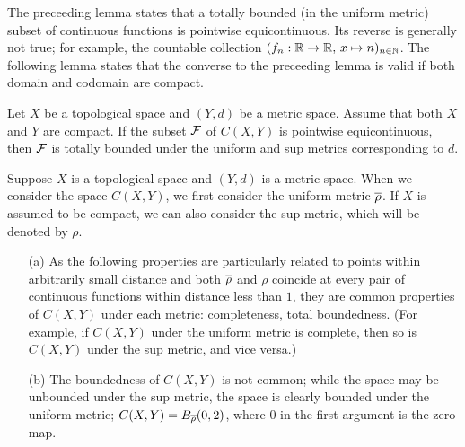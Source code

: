 The preceeding lemma states that a totally bounded (in the uniform metric) subset of continuous functions is pointwise equicontinuous.
Its reverse is generally not true; for example, the countable collection $(f_n: {\mathbb{R}}\rightarrow{\mathbb{R}},\,x\mapsto n)_{n\in{\mathbb{N}}}$.
The following lemma states that the converse to the preceeding lemma is valid if both domain and codomain are compact.
\begin{lem}
    Let $X$ be a topological space and $(Y, d)$ be a metric space.
    Assume that both $X$ and $Y$ are compact.
    If the subset ${\mathcal{F}}$ of $C(X, Y)$ is pointwise equicontinuous, then ${\mathcal{F}}$ is totally bounded under the uniform and sup metrics corresponding to $d$.
\end{lem}
\begin{rmk}
    Suppose $X$ is a topological space and $(Y, d)$ is a metric space.
    When we consider the space $C(X, Y)$, we first consider the uniform metric $\overline{\rho}$.
    If $X$ is assumed to be compact, we can also consider the sup metric, which will be denoted by $\rho$.
    \begin{enumerate}
        \item[(a)]
        {
            As the following properties are particularly related to points within arbitrarily small distance and both $\overline{\rho}$ and $\rho$ coincide at every pair of continuous functions within distance less than $1$, they are common properties of $C(X, Y)$ under each metric: completeness, total boundedness. (For example, if $C(X, Y)$ under the uniform metric is complete, then so is $C(X, Y)$ under the sup metric, and vice versa.)
        }
        \item[(b)]
        {
            The boundedness of $C(X, Y)$ is not common; while the space may be unbounded under the sup metric, the space is clearly bounded under the uniform metric; $C(X, Y)=B_{\overline{\rho}}(0, 2)$, where $0$ in the first argument is the zero map.
        }
    \end{enumerate}
\end{rmk}
